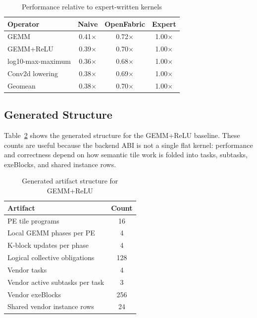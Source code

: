 \documentclass[conference]{IEEEtran}
\newcommand{\systemname}{OpenFabric}
\begin{document}
\begin{table}[t]
\caption{Performance relative to expert-written kernels}
\label{tab:perf}
\centering
\begin{tabular}{lccc}
\toprule
\textbf{Operator} & \textbf{Naive} & \textbf{\systemname} & \textbf{Expert} \\
\midrule
GEMM & 0.41$\times$ & 0.72$\times$ & 1.00$\times$ \\
GEMM+ReLU & 0.39$\times$ & 0.70$\times$ & 1.00$\times$ \\
log10-max-maximum & 0.36$\times$ & 0.68$\times$ & 1.00$\times$ \\
Conv2d lowering & 0.38$\times$ & 0.69$\times$ & 1.00$\times$ \\
\midrule
Geomean & 0.38$\times$ & 0.70$\times$ & 1.00$\times$ \\
\bottomrule
\end{tabular}
\end{table}


\subsection{Generated Structure}

Table~\ref{tab:artifacts} shows the generated structure for the GEMM+ReLU
baseline. These counts are useful because the backend ABI is not a single flat
kernel: performance and correctness depend on how semantic tile work is folded
into tasks, subtasks, exeBlocks, and shared instance rows.

\begin{table}[t]
\caption{Generated artifact structure for GEMM+ReLU}
\label{tab:artifacts}
\centering
\begin{tabular}{lc}
\toprule
\textbf{Artifact} & \textbf{Count} \\
\midrule
PE tile programs & 16 \\
Local GEMM phases per PE & 4 \\
K-block updates per phase & 4 \\
Logical collective obligations & 128 \\
Vendor tasks & 4 \\
Vendor active subtasks per task & 3 \\
Vendor exeBlocks & 256 \\
Shared vendor instance rows & 24 \\
\bottomrule
\end{tabular}
\end{table}
\end{document}
